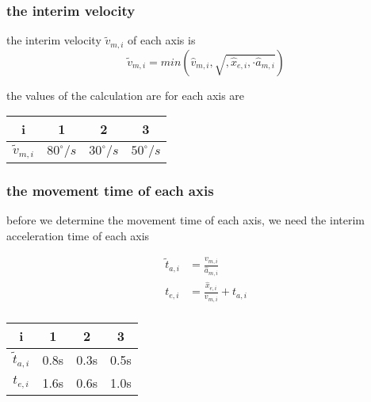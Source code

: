 \documentclass[%
  professionalfonts,%
  xcolor={%
    usenames,%
    dvipsnames,%
    svgnames,%
    table,%
    hyperref%
  }%
]{beamer}
\begin{document}
\subsubsection*{the interim velocity}
\begin{frame}
the interim velocity $\tilde{v}_{m,i}$ of each axis is 
\begin{equation*}
\tilde{v}_{m,i} = min\left(\hat{v}_{m,i},\sqrt{,\hat{x}_{e,i}, \cdot \hat{a}_{m,i}} \right) 
\end{equation*}

the values of the calculation are for each axis are
\begin{center}
\begin{tabular}{cccc}
\toprule
i & 1 & 2 & 3 \\
\midrule
$\tilde{v}_{m,i}$ & $80^\circ/s$ & $30^\circ/s$ & $50^\circ/s$ \\
\bottomrule
\end{tabular}
\end{center}
\end{frame}

\subsubsection*{the movement time of each axis}
\begin{frame}
before we determine the movement time of each axis, we need the interim acceleration time of each axis

\begin{align*}
\tilde{t}_{a,i} & = \frac{v_{m,i}}{\hat{a}_{m,i}} \\
t_{e,i} & = \frac{\hat{x}_{e,i}}{v_{m,i}} + t_{a,i} \\
\end{align*}

\begin{center}
\begin{tabular}{cccc}
\toprule
i & 1 & 2 & 3 \\
\midrule
$\tilde{t}_{a,i}$ & 0.8s & 0.3s & 0.5s \\ 
$t_{e,i}$ & 1.6s & 0.6s & 1.0s \\
\bottomrule 
\end{tabular}
\end{center} 
\end{frame}
\end{document}
